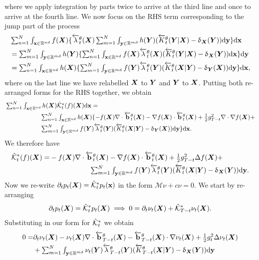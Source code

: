 where we apply integration by parts twice to arrive at the third line and once to arrive at the fourth line. We now focus on the RHS term corresponding to the jump part of the process
\begin{align}
    &\textstyle \sum_{n=1}^N \int_{{\mathbf{x}} \in \mathbb{R}^{nd}} f({\bm{X}}) \{ \overleftarrow{\lambda}_t^\theta({\bm{X}}) \sum_{m=1}^N \int_{\mathbf{y} \in \mathbb{R}^{md}} h({\bm{Y}}) ( \overleftarrow{K}_t^\theta({\bm{Y}} | {\bm{X}}) - \updelta_{{\bm{X}}}({\bm{Y}}) ) \mathrm{d} \mathbf{y} \} \mathrm{d} {\mathbf{x}} \\
    &\textstyle =\sum_{m=1}^N \int_{\mathbf{y} \in \mathbb{R}^{md}} h({\bm{Y}}) \{ \sum_{n=1}^N \int_{{\mathbf{x}} \in \mathbb{R}^{nd}} f({\bm{X}}) \overleftarrow{\lambda}_t^\theta({\bm{X}}) ( \overleftarrow{K}_t^\theta({\bm{Y}} | {\bm{X}}) - \updelta_{{\bm{X}}}({\bm{Y}}) ) \mathrm{d} {\mathbf{x}} \} \mathrm{d} \mathbf{y}\\
    &\textstyle =\sum_{n=1}^N \int_{{\mathbf{x}} \in \mathbb{R}^{nd}} h({\bm{X}}) \{ \sum_{m=1}^N \int_{\mathbf{y} \in \mathbb{R}^{md}} f({\bm{Y}}) \overleftarrow{\lambda}_t^\theta({\bm{Y}}) ( \overleftarrow{K}_t^\theta({\bm{X}} | {\bm{Y}}) - \updelta_{{\bm{Y}}}({\bm{X}}) ) \mathrm{d} \mathbf{y} \} \mathrm{d} {\mathbf{x}} , 
\end{align}
where on the last line we have relabelled ${\bm{X}}$ to ${\bm{Y}}$ and ${\bm{Y}}$ to ${\bm{X}}$. Putting both re-arranged forms for the RHS together, we obtain
\begin{align}
    &\textstyle \sum_{n=1}^N \int_{{\mathbf{x}} \in \mathbb{R}^{nd}} h({\bm{X}}) \hat{\mathcal{K}}_t^*(f)({\bm{X}}) \mathrm{d} {\mathbf{x}}  = \\
    &\textstyle \hspace{2cm} \sum_{n=1}^N \int_{{\mathbf{x}} \in \mathbb{R}^{nd}} h({\bm{X}}) \{ -f({\bm{X}}) \nabla \cdot \overleftarrow{\mathbf{b}}_t^\theta({\bm{X}}) - \nabla f({\bm{X}}) \cdot \overleftarrow{\mathbf{b}}_t^\theta({\bm{X}}) + \frac{1}{2} g_{T-t}^2 \nabla \cdot \nabla f ({\bm{X}}) + \\
    &\textstyle  \hspace{2cm} \sum_{m=1}^N \int_{\mathbf{y} \in \mathbb{R}^{md}} f({\bm{Y}}) \overleftarrow{\lambda}_t^\theta({\bm{Y}}) ( \overleftarrow{K}_t^\theta({\bm{X}} | {\bm{Y}}) - \updelta_{{\bm{Y}}}({\bm{X}}) ) \mathrm{d} \mathbf{y}  \} \mathrm{d} {\mathbf{x}} . 
\end{align}
We therefore have
\begin{align}
    \hat{\mathcal{K}}^*_t(f)({\bm{X}}) =&\textstyle   -f({\bm{X}}) \nabla \cdot \overleftarrow{\mathbf{b}}_t^\theta({\bm{X}}) - \nabla f({\bm{X}}) \cdot \overleftarrow{\mathbf{b}}_t^\theta({\bm{X}}) + \frac{1}{2} g_{T-t}^2 \Delta f({\bm{X}}) + \\
    &\textstyle  \hspace{2cm} \sum_{m=1}^N \int_{\mathbf{y} \in \mathbb{R}^{md}} f({\bm{Y}}) \overleftarrow{\lambda}_t^\theta({\bm{Y}}) ( \overleftarrow{K}_t^\theta({\bm{X}} | {\bm{Y}}) - \updelta_{{\bm{X}}}({\bm{Y}}) ) \mathrm{d} \mathbf{y} . 
\end{align}
Now we re-write $\partial_t p_t({\bm{X}}) = \hat{\mathcal{K}}^*_t p_t({\mathbf{x}})$ in the form $\mathcal{M}\nu + c \nu = 0$. We start by re-arranging
\begin{equation}
\partial_t p_t({\bm{X}}) = \hat{\mathcal{K}}^*_t p_t({\bm{X}}) \implies 0 = \partial_t \nu_t({\bm{X}}) + \hat{\mathcal{K}}^*_{T-t} \nu_t({\bm{X}}) . 
\end{equation}
Substituting in our form for $\hat{\mathcal{K}}^*_t$ we obtain
\begin{align}
    0 = &\textstyle \partial_t \nu_t(\mX) -  \nu_t(\mX) \nabla \cdot \backwarddrift_{T-t}^\theta(\mX) - \backwarddrift_{T-t}^\theta(\mX) \cdot \nabla \nu_t(\mX) + \frac{1}{2}g_{t}^2 \Delta \nu_t(\mX)\\
    &\textstyle  + \inty \nu_t(\mY) \backwardrate_{T-t}^\theta(\mY) ( \btk_{T-t}^\theta(\mX | \mY) - \updelta_{\mX}(\mY) ) \rmd\y
\label{eq:assm1LHS}
\end{align}

